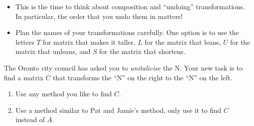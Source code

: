 \begin{iola}
	\begin{annotation}
		\begin{notes}
			\begin{itemize}
				\item This is the time to think about composition and ``undoing'' 
					transformations. In particular, the order that you undo
					them in matters!
				\item Plan the names of your transformations carefully. One option is to use the letters
					$T$ for matrix that makes it taller, $L$ for the matrix that leans,
					$U$ for the matrix that unleans, and $S$ for the matrix that shortens.
			\end{itemize}
		\end{notes}
	\end{annotation}

	The Oronto city council has asked you to \emph{unitalicise} the N.
	Your new task is to find a matrix $C$ that transforms the ``N'' on the right to the ``N'' on the left.
\begin{enumerate}
	\item Use any method you like to find $C$.
	\item Use a method similar to Pat and Jamie's method, only use it to find $C$ instead
		of $A$.
\end{enumerate}
\end{iola}


